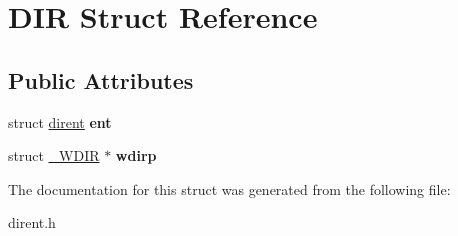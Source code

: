 \hypertarget{struct_d_i_r}{\section{D\-I\-R Struct Reference}
\label{struct_d_i_r}
}
\subsection*{Public Attributes}
\begin{DoxyCompactItemize}
\item 
\hypertarget{struct_d_i_r_a59e9f5211cbb2f8e5b2807ccfdd2a7fc}{struct \hyperlink{structdirent}{dirent} {\bfseries ent}}\label{struct_d_i_r_a59e9f5211cbb2f8e5b2807ccfdd2a7fc}

\item 
\hypertarget{struct_d_i_r_a29362d4a3d7f809d0f5418b26cac5d41}{struct \hyperlink{struct___w_d_i_r}{\-\_\-\-W\-D\-I\-R} $\ast$ {\bfseries wdirp}}\label{struct_d_i_r_a29362d4a3d7f809d0f5418b26cac5d41}

\end{DoxyCompactItemize}


The documentation for this struct was generated from the following file\-:\begin{DoxyCompactItemize}
\item 
dirent.\-h\end{DoxyCompactItemize}
